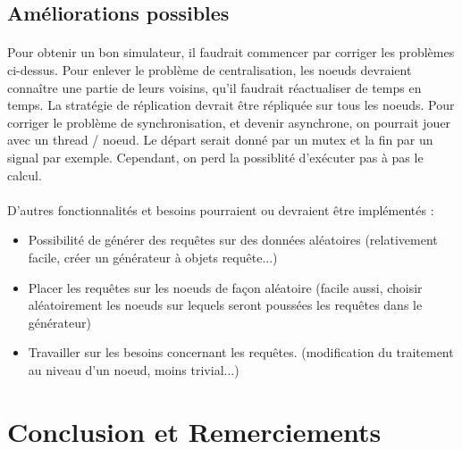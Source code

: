 \documentclass[12pt]{article}
\begin{document}
\subsection{Améliorations possibles}

\paragraph{}Pour obtenir un bon simulateur, il faudrait commencer par corriger les problèmes ci-dessus. Pour enlever le problème de centralisation, les noeuds devraient connaître une partie de leurs voisins, qu'il faudrait réactualiser de temps en temps. La stratégie de réplication devrait être répliquée sur tous les noeuds. Pour corriger le problème de synchronisation, et devenir asynchrone, on pourrait jouer avec un thread / noeud. Le départ serait donné par un mutex et la fin par un signal par exemple. Cependant, on perd la possiblité d'exécuter pas à pas le calcul.

\paragraph{}D'autres fonctionnalités et besoins pourraient ou devraient être implémentés : 

\begin{itemize}
    \item Possibilité de générer des requêtes sur des données aléatoires (relativement facile, créer un générateur à objets requête...)
    \item Placer les requêtes sur les noeuds de façon aléatoire (facile aussi, choisir aléatoirement les noeuds sur lequels seront poussées les requêtes dans le générateur)
    \item Travailler sur les besoins concernant les requêtes. (modification du traitement au niveau d'un noeud, moins trivial...)
\end{itemize}

\paragraph{}

\section{Conclusion et Remerciements}
\end{document}
